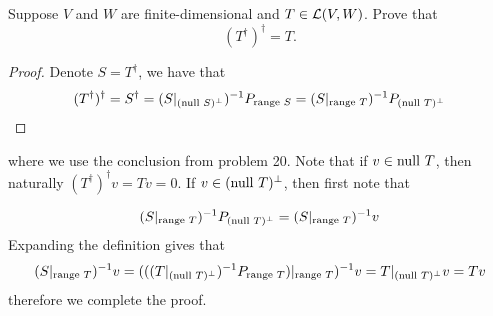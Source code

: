 \documentclass{extarticle}
\begin{document}
\begin{problem}{23}
    Suppose \(V\) and \(W\) are finite-dimensional and \(T \in \mathcal{L}(V, W)\). Prove that 
    \[(T^\dagger)^\dagger = T.\]
\end{problem}

\begin{proof}
Denote \(S = T^\dagger\), we have that 
\[(T^\dagger)^\dagger = S^\dagger = (S|_{(\text{null } S)^\perp})^{-1} P_{\text{range } S} 
= (S|_{\text{range } T})^{-1} P_{(\text{null } T)^\perp}\]
\end{proof} 

where we use the conclusion from problem 20. Note that if \(v \in \text{null } T\), then naturally 
\((T^\dagger)^\dagger v = Tv = 0\). If \(v \in (\text{null } T)^{\perp}\), then first note that 

\[(S|_{\text{range } T})^{-1} P_{(\text{null } T)^\perp} = (S|_{\text{range } T})^{-1} v \] 
Expanding the definition gives that 
\[(S|_{\text{range } T})^{-1}v = (((T|_{(\text{null } T)^\perp})^{-1} P_{\text{range } T})|_{\text{range } T})^{-1} v
= T|_{(\text{null } T)^\perp}v = Tv\]
therefore we complete the proof. 
\end{document}
